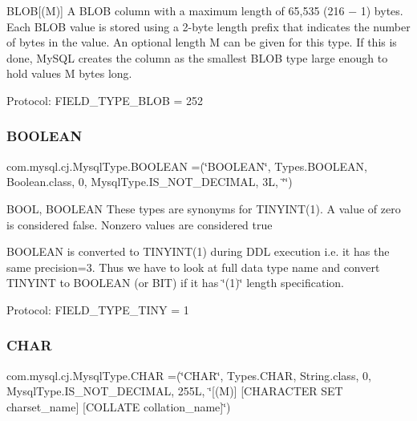 B\+L\+OB\mbox{[}(M)\mbox{]} A B\+L\+OB column with a maximum length of 65,535 (216 − 1) bytes. Each B\+L\+OB value is stored using a 2-\/byte length prefix that indicates the number of bytes in the value. An optional length M can be given for this type. If this is done, My\+S\+QL creates the column as the smallest B\+L\+OB type large enough to hold values M bytes long.

Protocol\+: F\+I\+E\+L\+D\+\_\+\+T\+Y\+P\+E\+\_\+\+B\+L\+OB = 252 \mbox{\label{enumcom_1_1mysql_1_1cj_1_1_mysql_type_a009ae534b2a4c9a6e60837c1ca1e53b9}} 
\subsubsection{\texorpdfstring{B\+O\+O\+L\+E\+AN}{BOOLEAN}}
{\footnotesize\ttfamily com.\+mysql.\+cj.\+Mysql\+Type.\+B\+O\+O\+L\+E\+AN =(\char`\"{}B\+O\+O\+L\+E\+AN\char`\"{}, Types.\+B\+O\+O\+L\+E\+AN, Boolean.\+class, 0, Mysql\+Type.\+I\+S\+\_\+\+N\+O\+T\+\_\+\+D\+E\+C\+I\+M\+AL, 3\+L, \char`\"{}\char`\"{})}

B\+O\+OL, B\+O\+O\+L\+E\+AN These types are synonyms for T\+I\+N\+Y\+I\+N\+T(1). A value of zero is considered false. Nonzero values are considered true

B\+O\+O\+L\+E\+AN is converted to T\+I\+N\+Y\+I\+N\+T(1) during D\+DL execution i.\+e. it has the same precision=3. Thus we have to look at full data type name and convert T\+I\+N\+Y\+I\+NT to B\+O\+O\+L\+E\+AN (or B\+IT) if it has \char`\"{}(1)\char`\"{} length specification.

Protocol\+: F\+I\+E\+L\+D\+\_\+\+T\+Y\+P\+E\+\_\+\+T\+I\+NY = 1 \mbox{\label{enumcom_1_1mysql_1_1cj_1_1_mysql_type_a7bcb1882ce4e4d44421d877d3f1f64a9}} 
\subsubsection{\texorpdfstring{C\+H\+AR}{CHAR}}
{\footnotesize\ttfamily com.\+mysql.\+cj.\+Mysql\+Type.\+C\+H\+AR =(\char`\"{}C\+H\+AR\char`\"{}, Types.\+C\+H\+AR, String.\+class, 0, Mysql\+Type.\+I\+S\+\_\+\+N\+O\+T\+\_\+\+D\+E\+C\+I\+M\+AL, 255\+L, \char`\"{}\mbox{[}(\+M)\mbox{]} \mbox{[}\+C\+H\+A\+R\+A\+C\+T\+E\+R S\+E\+T charset\+\_\+name\mbox{]} \mbox{[}\+C\+O\+L\+L\+A\+T\+E collation\+\_\+name\mbox{]}\char`\"{})}

